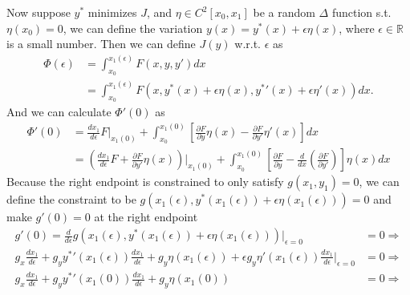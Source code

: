 \documentclass[conference,onecolumn]{IEEEtran}
\begin{document}
\begin{enumerate}
            Now suppose $y^*$ minimizes $J$, and $\eta \in C^2 [x_0, x_1]$ be a random $\Delta$ function s.t. $\eta(x_0) = 0$, we can define the variation $y(x) = y^*(x) + \epsilon \eta(x)$, where $\epsilon \in \mathbb{R}$ is a small number.
            Then we can define $J(y)$ w.r.t. $\epsilon$ as
            \begin{align*}
                  \Phi (\epsilon) & = \int_{x_0}^{x_1(\epsilon)} F(x, y, y') dx                                                     \\
                                  & = \int_{x_0}^{x_1(\epsilon)} F(x, y^*(x) + \epsilon \eta(x), {y^*}'(x) + \epsilon \eta'(x)) dx.
            \end{align*}
            And we can calculate $\Phi'(0)$ as
            \begin{align*}
                  \Phi'(0) & = \frac{dx_1}{d \epsilon} F \bigg|_{x_1(0)} + \int_{x_0}^{x_1(0)} \left[ \frac{\partial F}{\partial y}\eta(x) - \frac{\partial F}{\partial y'} \eta'(x) \right] dx                                                                             \\
                           & = \left( \frac{dx_1}{d \epsilon} F + \frac{\partial F}{\partial y'} \eta(x) \right) \bigg|_{x_1(0)} + \int_{x_0}^{x_1(0)} \left[ \frac{\partial F}{\partial y} - \frac{d}{dx} \left( \frac{\partial F}{\partial y'} \right) \right] \eta(x) dx
            \end{align*}
            Because the right endpoint is constrained to only satisfy $g(x_1, y_1) = 0$, we can define the constraint to be $g(x_1(\epsilon), y^*(x_1(\epsilon)) + \epsilon \eta(x_1(\epsilon))) = 0$ and make $g'(0) = 0$ at the right endpoint
            \begin{align*}
                  g'(0)                                                                    = \frac{d}{d\epsilon} g(x_1(\epsilon), y^*(x_1(\epsilon)) + \epsilon \eta(x_1(\epsilon))) \bigg|_{\epsilon = 0}  & = 0 \Rightarrow                                       \\
                  g_x \frac{dx_1}{d\epsilon} + g_y {y^*}' (x_1(\epsilon)) \frac{dx_1}{d\epsilon} + g_y \eta(x_1(\epsilon)) + \epsilon g_y \eta'(x_1(\epsilon)) \frac{dx_1}{d\epsilon} \bigg|_{\epsilon = 0} & = 0 \Rightarrow                                       \\
                  g_x \frac{dx_1}{d\epsilon} + g_y {y^*}' (x_1(0)) \frac{dx_1}{d\epsilon} + g_y \eta(x_1(0))                                                                                                & = 0 \Rightarrow                                       \\

\end{align*}
\end{enumerate}
\end{document}
